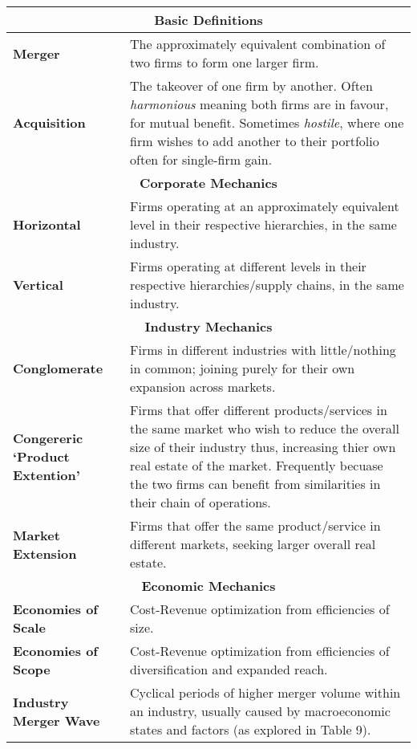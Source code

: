 \documentclass[11pt, english]{article}
\begin{document}
\begin{table}[h]
        \scriptsize
	\renewcommand{\arraystretch}{1.25}
\begin{center}
\begin{tabular}{p{4.5cm}p{8cm}}
	\hline
	\multicolumn{2}{c}{\textbf{Basic Definitions}}\\
        \hline
	\textbf{Merger} & The approximately equivalent combination of two firms to form one larger firm.\\
	\textbf{Acquisition} & The takeover of one firm by another. Often \textit{harmonious} meaning both firms are in favour, for mutual benefit. Sometimes \textit{hostile}, where one firm wishes to add another to their portfolio often for single-firm gain.\\
	\hline
        \multicolumn{2}{c}{\textbf{Corporate Mechanics}}\\
        \hline
        \textbf{Horizontal} & Firms operating at an approximately equivalent level in their respective hierarchies, in the same industry.\\
        \textbf{Vertical} & Firms operating at different levels in their respective hierarchies/supply chains, in the same industry.\\
        \hline
        \multicolumn{2}{c}{\textbf{Industry Mechanics}}\\
        \hline
        \textbf{Conglomerate} & Firms in different industries with little/nothing in common; joining purely for their own expansion across markets.\\
        \textbf{Congereric `Product Extention'} & Firms that offer different products/services in the same market who wish to reduce the overall size of their industry thus, increasing thier own real estate of the market. Frequently becuase the two firms can benefit from similarities in their chain of operations.\\
        \textbf{Market Extension} & Firms that offer the same product/service in different markets, seeking larger overall real estate.\\
        \hline
	\multicolumn{2}{c}{\textbf{Economic Mechanics}}\\
	\hline
	\textbf{Economies of Scale} & Cost-Revenue optimization from efficiencies of size.\\
	\textbf{Economies of Scope} & Cost-Revenue optimization from efficiencies of diversification and expanded reach.\\
	\textbf{Industry Merger Wave} & Cyclical periods of higher merger volume within an industry, usually caused by macroeconomic states and factors (as explored in Table 9).\\

\end{tabular}
\end{center}
\end{table}
\end{document}
